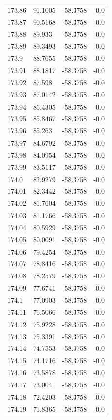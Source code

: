 \begin{table}[H]
\begin{tabular}{llll}
173.86 & 91.1005 & -58.3758 & -0.0 \\
173.87 & 90.5168 & -58.3758 & -0.0 \\
173.88 & 89.933 & -58.3758 & -0.0 \\
173.89 & 89.3493 & -58.3758 & -0.0 \\
173.9 & 88.7655 & -58.3758 & -0.0 \\
173.91 & 88.1817 & -58.3758 & -0.0 \\
173.92 & 87.598 & -58.3758 & -0.0 \\
173.93 & 87.0142 & -58.3758 & -0.0 \\
173.94 & 86.4305 & -58.3758 & -0.0 \\
173.95 & 85.8467 & -58.3758 & -0.0 \\
173.96 & 85.263 & -58.3758 & -0.0 \\
173.97 & 84.6792 & -58.3758 & -0.0 \\
173.98 & 84.0954 & -58.3758 & -0.0 \\
173.99 & 83.5117 & -58.3758 & -0.0 \\
174.0 & 82.9279 & -58.3758 & -0.0 \\
174.01 & 82.3442 & -58.3758 & -0.0 \\
174.02 & 81.7604 & -58.3758 & -0.0 \\
174.03 & 81.1766 & -58.3758 & -0.0 \\
174.04 & 80.5929 & -58.3758 & -0.0 \\
174.05 & 80.0091 & -58.3758 & -0.0 \\
174.06 & 79.4254 & -58.3758 & -0.0 \\
174.07 & 78.8416 & -58.3758 & -0.0 \\
174.08 & 78.2579 & -58.3758 & -0.0 \\
174.09 & 77.6741 & -58.3758 & -0.0 \\
174.1 & 77.0903 & -58.3758 & -0.0 \\
174.11 & 76.5066 & -58.3758 & -0.0 \\
174.12 & 75.9228 & -58.3758 & -0.0 \\
174.13 & 75.3391 & -58.3758 & -0.0 \\
174.14 & 74.7553 & -58.3758 & -0.0 \\
174.15 & 74.1716 & -58.3758 & -0.0 \\
174.16 & 73.5878 & -58.3758 & -0.0 \\
174.17 & 73.004 & -58.3758 & -0.0 \\
174.18 & 72.4203 & -58.3758 & -0.0 \\
174.19 & 71.8365 & -58.3758 & -0.0 \\

\end{tabular}
\end{table}
